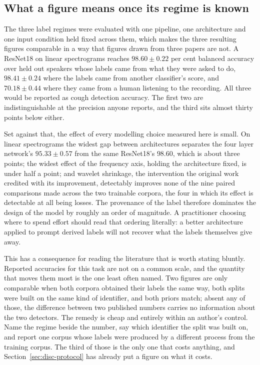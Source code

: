 \documentclass[pdflatex,sn-mathphys-num]{sn-jnl}
\begin{document}
\subsection{What a figure means once its regime is known}\label{sec:disc-regime}

The three label regimes were evaluated with one pipeline, one architecture and one input
condition held fixed across them, which makes the three resulting figures comparable in a
way that figures drawn from three papers are not. A ResNet18 on linear spectrograms
reaches $98.60 \pm 0.22$ per cent balanced accuracy over held out speakers whose labels
came from what they were asked to do, $98.41 \pm 0.24$ where the labels came from another
classifier's score, and $70.18 \pm 0.44$ where they came from a human listening to the
recording. All three would be reported as cough detection accuracy. The first two are
indistinguishable at the precision anyone reports, and the third sits almost thirty points
below either.

Set against that, the effect of every modelling choice measured here is small. On linear
spectrograms the widest gap between architectures separates the four layer network's
$95.33 \pm 0.57$ from the same ResNet18's $98.60$, which is about three points; the widest
effect of the frequency axis, holding the architecture fixed, is under half a point; and
wavelet shrinkage, the intervention the original work credited with its improvement,
detectably improves none of the nine paired comparisons made across the two trainable
corpora, the four in which its effect is detectable at all being losses. The provenance of the label
therefore dominates the design of the model by roughly an order of magnitude. A
practitioner choosing where to spend effort
should read that ordering literally: a better architecture applied to prompt derived
labels will not recover what the labels themselves give away.

This has a consequence for reading the literature that is worth stating bluntly. Reported
accuracies for this task are not on a common scale, and the quantity that moves them most
is the one least often named. Two figures are only comparable when both corpora obtained
their labels the same way, both splits were built on the same kind of identifier, and both
priors match; absent any of those, the difference between two published numbers carries no
information about the two detectors. The remedy is cheap and entirely within an author's
control. Name the regime beside the number, say which identifier the split was built on,
and report one corpus whose labels were produced by a different process from the training
corpus. The third of those is the only one that costs anything, and
Section~\ref{sec:disc-protocol} has already put a figure on what it costs.
\end{document}
